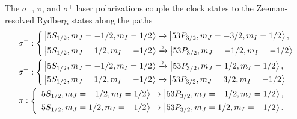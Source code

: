 The $\sigma^-$, $\pi$, and $\sigma^+$ laser polarizations couple the clock
states to the Zeeman-resolved Rydberg states along the paths
\begin{align}
&\sigma^-:
\left\{
\begin{aligned}
&\ket{5S_{1/2},m_J=-1/2, m_I=1/2} \xrightarrow{} \ket{53P_{3/2},m_J=-3/2, m_I=1/2},\\
&\ket{5S_{1/2},m_J=1/2, m_I=-1/2}  \xrightarrow{\gamma} \ket{53P_{3/2},m_J=-1/2, m_I=-1/2}
\end{aligned}
\right. \\
&\sigma^+:
\left\{
\begin{aligned}
&\ket{5S_{1/2},m_J=-1/2, m_I=1/2} \xrightarrow{\gamma} \ket{53P_{3/2},m_J=1/2, m_I=1/2},\\
&\ket{5S_{1/2},m_J=1/2, m_I=-1/2} \xrightarrow{} \ket{53P_{3/2},m_J=3/2, m_I=-1/2}
\end{aligned}
\right.\\
&\pi:
\left\{
\begin{aligned}
&\ket{5S_{1/2},m_J=-1/2, m_I=1/2} \to \ket{53P_{3/2},m_J=-1/2, m_I=1/2},\\
&\ket{5S_{1/2},m_J=1/2, m_I=-1/2} \to \ket{53P_{3/2},m_J=1/2, m_I=-1/2}.
\end{aligned}
\right.
\end{align}

